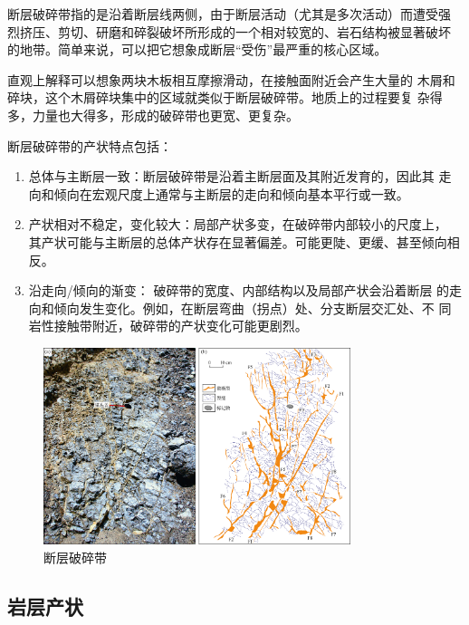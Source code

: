 \documentclass[a4paper,twoside]{ctexart}
\begin{document}
断层破碎带指的是沿着断层线两侧，由于断层活动（尤其是多次活动）而遭受强
烈挤压、剪切、研磨和碎裂破坏所形成的一个相对较宽的、岩石结构被显著破坏
的地带。简单来说，可以把它想象成断层“受伤”最严重的核心区域。

直观上解释可以想象两块木板相互摩擦滑动，在接触面附近会产生大量的
木屑和碎块，这个木屑碎块集中的区域就类似于断层破碎带。地质上的过程要复
杂得多，力量也大得多，形成的破碎带也更宽、更复杂。

断层破碎带的产状特点包括：
\begin{enumerate}
\item 总体与主断层一致：断层破碎带是沿着主断层面及其附近发育的，因此其
  走向和倾向在宏观尺度上通常与主断层的走向和倾向基本平行或一致。
\item 产状相对不稳定，变化较大：局部产状多变，在破碎带内部较小的尺度上，
  其产状可能与主断层的总体产状存在显著偏差。可能更陡、更缓、甚至倾向相
  反。 
\item 沿走向/倾向的渐变： 破碎带的宽度、内部结构以及局部产状会沿着断层
  的走向和倾向发生变化。例如，在断层弯曲（拐点）处、分支断层交汇处、不
  同岩性接触带附近，破碎带的产状变化可能更剧烈。
\end{enumerate}

\begin{figure}[htbp]
  \centering
    \includegraphics[width=0.8\textwidth]{pic/断层破碎带.png}
  \caption{断层破碎带}
  \label{fig:断层破碎带}
\end{figure}

\subsection{岩层产状}
\end{document}
